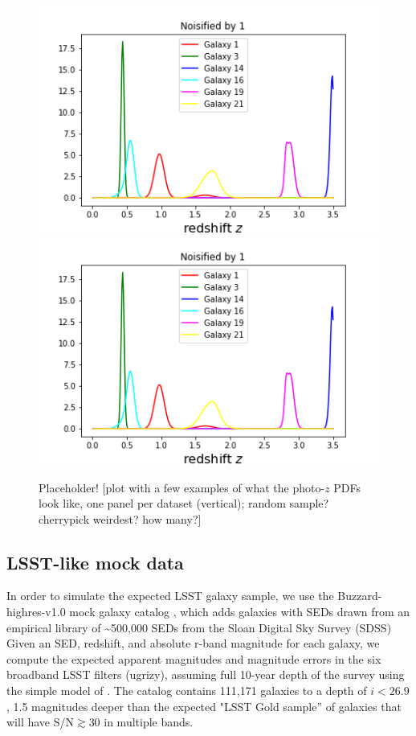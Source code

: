 \documentclass[\docopts]{\docclass}
\newcommand{\pz}{photo-$z$ PDF}
\begin{document}
\begin{figure}
  \includegraphics[width=0.9\columnwidth]{figures/pz_placeholder.png}\\
  \includegraphics[width=0.9\columnwidth]{figures/pz_placeholder.png}
  \caption{Placeholder! [plot with a few examples of what the \pz s look like, 
one panel per dataset (vertical); random sample? cherrypick weirdest? how many?]
  \label{fig:pzs}}
\end{figure}

\subsection{LSST-like mock data}
\label{sec:LSST}

In order to simulate the expected LSST galaxy sample, we use the 
Buzzard-highres-v1.0 mock galaxy catalog , which 
adds galaxies with SEDs drawn from an empirical library of \sim500,000 SEDs 
from the Sloan Digital Sky Survey  (SDSS)     Given an SED, redshift, and absolute r-band 
magnitude for each galaxy, we compute the expected apparent magnitudes and 
magnitude errors in the six broadband LSST filters (ugrizy), assuming full 
10-year depth of the survey using the simple model of 
\citet{ivezic_lsst:_2008}.  The catalog contains 111,171 galaxies to a depth of 
$i<26.9$, 1.5 magnitudes deeper than the expected "LSST Gold sample'' of 
galaxies that will have S/N$\gtrsim$30 in multiple bands.
\end{document}
